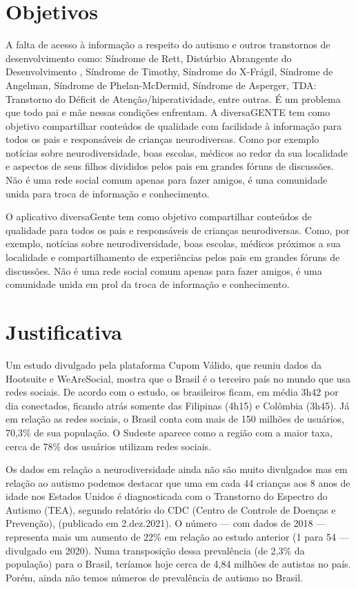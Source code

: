 \section{Objetivos}

A falta de acesso à informação a respeito do autismo e outros transtornos de desenvolvimento como: Síndrome de Rett, Distúrbio Abrangente do Desenvolvimento , Síndrome de Timothy, Síndrome do X-Frágil, Síndrome de Angelman, Síndrome de Phelan-McDermid, Síndrome de Asperger, TDA: Transtorno do Déficit de Atenção/hiperatividade, entre outras. É um problema que todo pai e mãe nessas condições enfrentam. A diversaGENTE tem como objetivo compartilhar conteúdos de qualidade com facilidade à informação para todos os pais e responsáveis de crianças neurodiversas. Como por exemplo notícias sobre neurodiversidade, boas escolas, médicos ao redor da sua localidade e aspectos de seus filhos divididos pelos pais em grandes fóruns de discussões. Não é uma rede social comum apenas para fazer amigos, é uma comunidade unida para troca de informação e conhecimento.


O aplicativo diversaGente tem como objetivo compartilhar conteúdos de qualidade para todos os pais e responsáveis de crianças neurodiversas. Como, por exemplo, notícias sobre neurodiversidade, boas escolas, médicos próximos a sua localidade e compartilhamento de experiências pelos pais em grandes fóruns de discussões. Não é uma rede social comum apenas para fazer amigos, é uma comunidade unida em prol da troca de informação e conhecimento.

\section{Justificativa}

Um estudo divulgado pela plataforma Cupom Válido, que reuniu dados da Hootsuite e WeAreSocial, mostra que o Brasil é o terceiro país no mundo que usa redes sociais. De acordo com o estudo, os brasileiros ficam, em média 3h42 por dia conectados, ficando atrás somente das Filipinas (4h15) e Colômbia (3h45).
Já em relação as redes sociais, o Brasil conta com mais de 150 milhões de usuários, 70,3\% de sua população. O Sudeste aparece como a região com a maior taxa, cerca de 78\% dos usuários utilizam redes sociais.

Os dados em relação a neurodiversidade ainda não são muito divulgados mas em relação ao autismo podemos destacar que uma em cada 44 crianças aos 8 anos de idade nos Estados Unidos é diagnosticada com o Transtorno do Espectro do Autismo (TEA), segundo relatório do CDC (Centro de Controle de Doenças e Prevenção), (publicado em 2.dez.2021). O número — com dados de 2018 — representa mais um aumento de 22\% em relação ao estudo anterior (1 para 54 — divulgado em 2020). Numa transposição dessa prevalência (de 2,3\% da população) para o Brasil, teríamos hoje cerca de 4,84 milhões de autistas no país. Porém, ainda não temos números de prevalência de autismo no Brasil.

